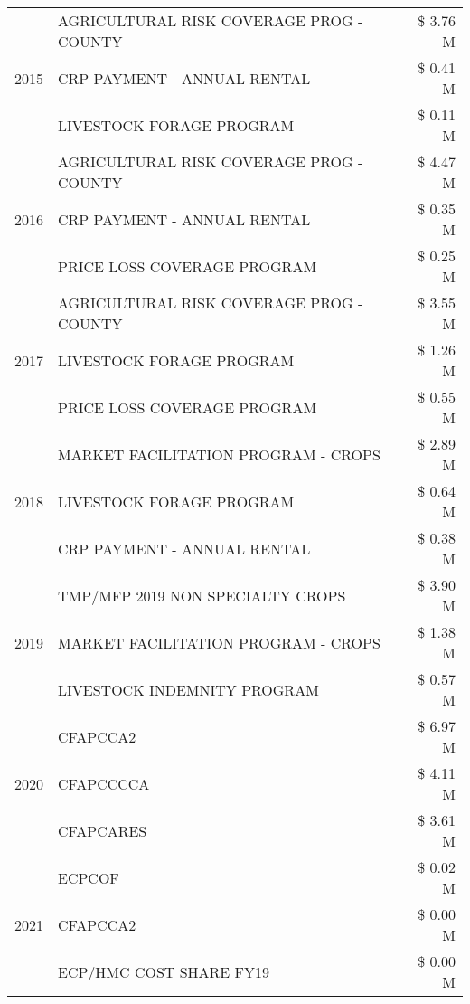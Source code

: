 \begin{tabular}{llr}
\cline{1-3}
\multirow[t]{3}{*}{2015} & AGRICULTURAL RISK COVERAGE PROG - COUNTY & \$ 3.76 M \\
 & CRP PAYMENT - ANNUAL RENTAL & \$ 0.41 M \\
 & LIVESTOCK FORAGE PROGRAM & \$ 0.11 M \\
\cline{1-3}
\multirow[t]{3}{*}{2016} & AGRICULTURAL RISK COVERAGE PROG - COUNTY & \$ 4.47 M \\
 & CRP PAYMENT - ANNUAL RENTAL & \$ 0.35 M \\
 & PRICE LOSS COVERAGE PROGRAM & \$ 0.25 M \\
\cline{1-3}
\multirow[t]{3}{*}{2017} & AGRICULTURAL RISK COVERAGE PROG - COUNTY & \$ 3.55 M \\
 & LIVESTOCK FORAGE PROGRAM & \$ 1.26 M \\
 & PRICE LOSS COVERAGE PROGRAM & \$ 0.55 M \\
\cline{1-3}
\multirow[t]{3}{*}{2018} & MARKET FACILITATION PROGRAM - CROPS & \$ 2.89 M \\
 & LIVESTOCK FORAGE PROGRAM & \$ 0.64 M \\
 & CRP PAYMENT - ANNUAL RENTAL & \$ 0.38 M \\
\cline{1-3}
\multirow[t]{3}{*}{2019} & TMP/MFP 2019 NON SPECIALTY CROPS & \$ 3.90 M \\
 & MARKET FACILITATION PROGRAM - CROPS & \$ 1.38 M \\
 & LIVESTOCK INDEMNITY PROGRAM & \$ 0.57 M \\
\cline{1-3}
\multirow[t]{3}{*}{2020} & CFAPCCA2 & \$ 6.97 M \\
 & CFAPCCCCA & \$ 4.11 M \\
 & CFAPCARES & \$ 3.61 M \\
\cline{1-3}
\multirow[t]{3}{*}{2021} & ECPCOF & \$ 0.02 M \\
 & CFAPCCA2 & \$ 0.00 M \\
 & ECP/HMC COST SHARE FY19 & \$ 0.00 M \\
\cline{1-3}
\bottomrule
\end{tabular}
